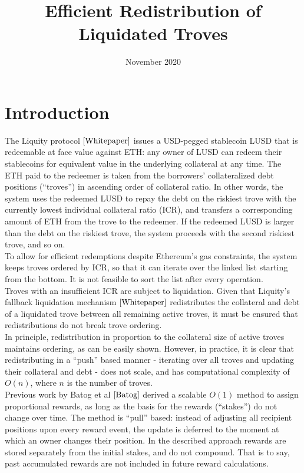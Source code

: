\documentclass[reqno]{article}
\begin{document}
\title{\textbf{Efficient Redistribution of Liquidated Troves}}
\date{November 2020}
\maketitle

\tableofcontents

\section{Introduction}


The Liquity protocol $\cite{Whitepaper}$ issues a USD-pegged stablecoin LUSD that is redeemable at face value against ETH: any owner of LUSD can redeem their stablecoins for equivalent value in the underlying collateral at any time. The ETH paid to the redeemer is taken from the borrowers' collateralized debt positions (“troves”) in ascending order of collateral ratio. In other words, the system uses the redeemed LUSD to repay the debt on the riskiest trove with the currently lowest individual collateral ratio (ICR), and transfers a corresponding amount of ETH from the trove to the redeemer. If the redeemed LUSD is larger than the debt on the riskiest trove, the system proceeds with the second riskiest trove, and so on. \\

To allow for efficient redemptions despite Ethereum's gas constraints, the system keeps troves ordered by ICR, so that it can iterate over the linked list starting from the bottom. It is not feasible to sort the list after every operation. \\

Troves with an insufficient ICR are subject to liquidation. Given that Liquity's fallback liquidation mechanism $\cite{Whitepaper}$ redistributes the collateral and debt of a liquidated trove between all remaining active troves, it must be ensured that redistributions do not break trove ordering. \\

In principle, redistribution in proportion to the collateral size of active troves maintains ordering, as can be easily shown. However, in practice, it is clear that redistributing in a “push” based manner - iterating over all troves and updating their collateral and debt - does not scale, and has computational complexity of $O(n)$, where $n$ is the number of troves. \\

Previous work by Batog et al $\cite{Batog}$ derived a scalable $O(1)$ method to assign proportional rewards, as long as the basis for the rewards (“stakes”) do not change over time. The method is “pull” based: instead of adjusting all recipient positions upon every reward event, the update is deferred to the moment at which an owner changes their position. In the described approach rewards are stored separately from the initial stakes, and do not compound. That is to say, past accumulated rewards are not included in future reward calculations. \\
\end{document}
